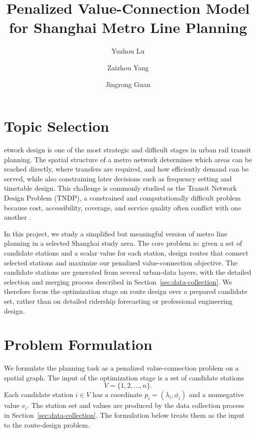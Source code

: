 \documentclass[9pt,a4paper,twocolumn,twoside]{tau-class/tau}
\title{Penalized Value-Connection Model for Shanghai Metro Line Planning}
\author[a,1]{Yuzhou Lu}
\author[a,2]{Zaizhou Yang}
\author[a,3]{Jingrong Guan}
\affil[a]{ShanghaiTech University}
\begin{document}
		
    \maketitle 
    \thispagestyle{firststyle}
    

\section{Topic Selection}

    etwork design is one of the most strategic and difficult stages in urban rail transit planning. The spatial structure of a metro network determines which areas can be reached directly, where transfers are required, and how efficiently demand can be served, while also constraining later decisions such as frequency setting and timetable design. This challenge is commonly studied as the Transit Network Design Problem (TNDP), a constrained and computationally difficult problem because cost, accessibility, coverage, and service quality often conflict with one another \cite{owais2026tndp}.

    In this project, we study a simplified but meaningful version of metro line planning in a selected Shanghai study area. The core problem is: given a set of candidate stations and a scalar value for each station, design routes that connect selected stations and maximize our penalized value-connection objective. The candidate stations are generated from several urban-data layers, with the detailed selection and merging process described in Section~\ref{sec:data-collection}. We therefore focus the optimization stage on route design over a prepared candidate set, rather than on detailed ridership forecasting or professional engineering design.



\section{Problem Formulation}

    We formulate the planning task as a penalized value-connection problem on a spatial graph. The input of the optimization stage is a set of candidate stations
    \[
        V = \{1,2,\ldots,n\}.
    \]
    Each candidate station $i \in V$ has a coordinate $p_i=(\lambda_i,\phi_i)$ and a nonnegative value $v_i$. The station set and values are produced by the data collection process in Section~\ref{sec:data-collection}. The formulation below treats them as the input to the route-design problem.
\end{document}
